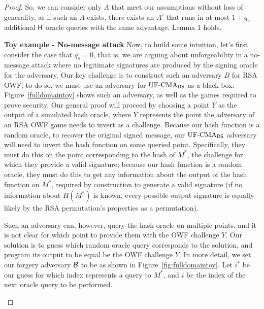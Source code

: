 \begin{proof}
So, we can consider only $A$ that meet our assumptions without loss of generality, as if such an $A$ exists, there exists an $A'$ that runs in at most $1+q_s$ additional $\mathsf{H}$ oracle queries with the same advantage.  Lemma 1 holds.

\textbf{Toy example - No-message attack} Now, to build some intuition, let's first consider the case that $q_s = 0$, that is, 
we are arguing about unforgeability in a no-message attack where no legitimate signatures are produced by the signing oracle for the adversary.  Our key challenge is to construct such an adversary $B$ for RSA OWF; to do so, we must use an adversary for $\textnormal{UF-CMA}_{{\mathsf{DS}}}$ as a black box.  Figure~\ref{fulldomaintoy} shows such an adversary, as well as the games required to prove security.  Our general proof will proceed by choosing a point $Y$ as the output of a simulated hash oracle, where $Y$ represents the point the adversary of an RSA OWF game needs to invert as a challenge.  Because our hash function is a random oracle, to recover the original signed message, our $\textnormal{UF-CMA}_{{\mathsf{DS}}}$ adversary will need to invert the hash function on some queried point.  Specifically, they must do this on the point corresponding to the hash of $M^*$, the challenge for which they provide a valid signature; because our hash function is a random oracle, they must do this to get any information about the output of the hash function on $M^*$, required by construction to generate a valid signature (if no information about $H(M^*)$ is known, every possible output signature is equally likely by the RSA permutation's properties as a permutation).

Such an adversary can, however, query the hash oracle on multiple points, and it is not clear for which point to provide them with the OWF challenge $Y$.  
Our solution is to 
guess which random oracle query corresponds to the solution, and program its
output to be equal be the OWF challenge $Y$.  In more detail, we set our forgery
adversary ${\mathcal B}$ to be as shown in Figure~\ref{fig:fulldomaintoy}.  Let $i^*$ be our guess for which index represents a query to $M^*$, and $i$ be the index of the next oracle query to be performed.

\begin{figure}
\centering
{}
\end{figure}
\end{proof}
